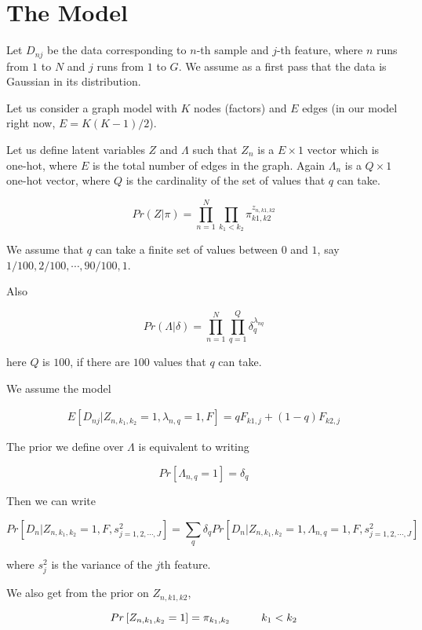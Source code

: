 \documentclass[12pt]{article}
\begin{document}
\section{The Model}

Let $D_{nj}$ be the data corresponding to $n$-th sample and $j$-th feature, where $n$ runs from $1$ to $N$ and $j$ runs from $1$ to $G$. We assume as a first pass that the data is Gaussian in its distribution. 

Let us consider a graph model with $K$ nodes (factors) and $E$ edges (in our model right now, $E=K(K-1)/2$).

Let us define latent variables $Z$ and $\Lambda$ such that $Z_{n}$ is a $E \times 1$ vector which is one-hot, where $E$ is the total number of edges in the graph. Again $\Lambda_{n}$ is a $Q \times 1$ one-hot vector, where $Q$ is the cardinality of the set of values that $q$ can take. 

$$  Pr (Z |  \pi )  = \prod_{n=1}^{N} \prod_{k_1 < k_2} \pi_{k1,k2}^{z_{n,k1,k2}} $$

We assume that $q$ can take a finite set of values between $0$ and $1$, 
say $1/100, 2/100, \cdots, 90/100, 1$.

Also

$$  Pr (\Lambda | \delta ) = \prod_{n=1}^{N} \prod_{q=1}^{Q} \delta_{q}^{\lambda_{nq}} $$

here $Q$ is $100$, if there are $100$ values that $q$ can take.

We assume the model 

\begin{eqnarray}
 E \left [ D_{nj} | Z_{n, k_1, k_2} = 1, \lambda_{n,q}=1, F \right] = q F_{k1,j} + (1-q) F_{k2,j}
\end{eqnarray}

The prior we define over $\Lambda$ is equivalent to writing 

$$ Pr \left [ \Lambda_{n, q} = 1 \right ] = \delta_{q}  $$

Then we can write 

$$ Pr \left [ D_{n} | Z_{n, k_1, k_2}=1, F, s^2_{j=1,2,\cdots,J} \right ] = \sum_{q} \delta_{q} Pr \left [D_{n} | Z_{n, k_1, k_2}=1, \Lambda_{n, q}=1, F, s^2_{j=1,2,\cdots,J} \right ] $$

where $s^2_{j}$ is the variance of the $j$th feature.

We also get from the prior on $Z_{n,k1,k2}$,

$$ Pr \left [ Z_{n, k_1, k_2} = 1 \right ] = \pi_{k_1,k_2} \hspace{1 cm} k_1 < k_2$$
\end{document}
